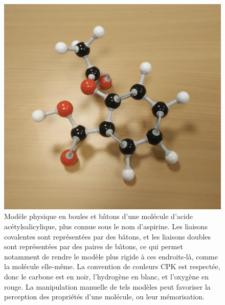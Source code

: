 	
	\begin{figure}[H]
		\centering
		\includegraphics[width=\textwidth]{figures/ch1/aspirin}
		\caption{Modèle physique en boules et bâtons d'une molécule d'acide acétylsalicylique, plus connue sous le nom d'aspirine. Les liaisons covalentes sont représentées par des bâtons, et les liaisons doubles sont représentées par des paires de bâtons, ce qui permet notamment de rendre le modèle plus rigide à ces endroits-là, comme la molécule elle-même. La convention de couleurs CPK est respectée, donc le carbone est en noir, l'hydrogène en blanc, et l'oxygène en rouge. La manipulation manuelle de tels modèles peut favoriser la perception des propriétés d'une molécule, ou leur mémorisation.}
		\label{fig:aspirin}
	\end{figure}
	
